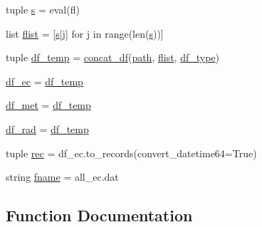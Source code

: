 \begin{DoxyCompactItemize}
tuple \hyperlink{namespace_date___ranges___concat_a318819433e09d063ee652df56c6cc495}{s} = eval(fl)
\item 
list \hyperlink{namespace_date___ranges___concat_ac0724de24e84d20872e1d08a28a73fac}{flist} = \mbox{[}\hyperlink{namespace_date___ranges___concat_a318819433e09d063ee652df56c6cc495}{s}\mbox{[}j\mbox{]} for j in range(len(\hyperlink{namespace_date___ranges___concat_a318819433e09d063ee652df56c6cc495}{s}))\mbox{]}
\item 
tuple \hyperlink{namespace_date___ranges___concat_a039c0a41a1dc09c14f8b72186850d0a4}{df\+\_\+temp} = \hyperlink{namespace_date___ranges___concat_af59a5254a569d9161e71627efb4aaf30}{concat\+\_\+df}(\hyperlink{namespace_date___ranges___concat_a2b3a66331b773dfcae06fbf3e0426bc8}{path}, \hyperlink{namespace_date___ranges___concat_ac0724de24e84d20872e1d08a28a73fac}{flist}, \hyperlink{namespace_date___ranges___concat_a34d743f3f351e0c5fdce2c21586a234d}{df\+\_\+type})
\item 
\hyperlink{namespace_date___ranges___concat_aa81d32149c73a93c7c0cf4d6215e4616}{df\+\_\+ec} = \hyperlink{namespace_date___ranges___concat_a039c0a41a1dc09c14f8b72186850d0a4}{df\+\_\+temp}
\item 
\hyperlink{namespace_date___ranges___concat_a16a14361f76262d8416a6825e111896a}{df\+\_\+met} = \hyperlink{namespace_date___ranges___concat_a039c0a41a1dc09c14f8b72186850d0a4}{df\+\_\+temp}
\item 
\hyperlink{namespace_date___ranges___concat_a4f4bd2ce4ac7c6df40e6d37af0f28ab4}{df\+\_\+rad} = \hyperlink{namespace_date___ranges___concat_a039c0a41a1dc09c14f8b72186850d0a4}{df\+\_\+temp}
\item 
tuple \hyperlink{namespace_date___ranges___concat_ac0cc4e95ba47cc142babd87c506585a0}{rec} = df\+\_\+ec.\+to\+\_\+records(convert\+\_\+datetime64=True)
\item 
string \hyperlink{namespace_date___ranges___concat_a86701c1e83bc108fd48d569692baf90a}{fname} = \textquotesingle{}all\+\_\+ec.\+dat\textquotesingle{}
\end{DoxyCompactItemize}


\subsection{Function Documentation}
\hypertarget{namespace_date___ranges___concat_af59a5254a569d9161e71627efb4aaf30}{}
